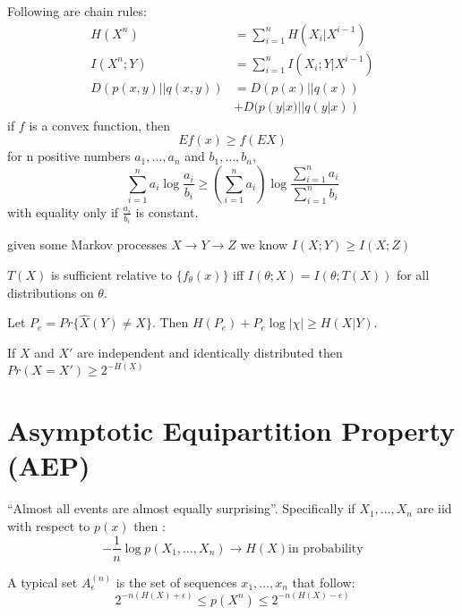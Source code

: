 \documentclass[10pt]{article}
\begin{document}
\begin{scriptsize}
\begin{multicols}{3}
Following are chain rules:
\begin{align}
H(X^n)&=\sum_{i=1}^n H(X_i|X^{i-1})\\
I(X^n;Y)&=\sum_{i=1}^n I(X_i;Y|X^{i-1})\\
D(p(x,y)||q(x,y))&=D(p(x)||q(x))\\
&+D(p(y|x)||q(y|x))
\end{align}
 \label{thm: jensen}
if $f$ is a convex function, then
\begin{equation}
Ef(x) \geq f(EX)
\end{equation}
 \label{thm: log sum}
for n positive numbers $a_1,\ldots,a_n$ and $b_1,\ldots,b_n$,
\begin{equation}
\sum_{i=1}^n a_i \log \frac{a_i}{b_i} \geq \left( \sum_{i=1}^n a_i \right) \log \frac{\sum_{i=1}^n a_i}{\sum_{i=1}^n b_i}
\end{equation}
with equality only if $\frac{a_i}{b_i}$ is constant. 

 \label{thm: data processing} 
given some Markov processes $X\rightarrow Y\rightarrow Z$ we know
\( I(X;Y) \geq I(X;Z) \)

 \label{thm: suff stats}
$T(X)$ is sufficient relative to $\{f_\theta (x)\}$ iff $I(\theta;X)=I(\theta;T(X))$ for all distributions on $\theta$.

 \label{thm: fano}
Let $P_e=Pr\{\hat{X}(Y)\neq X\}$. Then $H(P_e)+P_e \log |\chi| \geq H(X|Y)$.

\thm[Inequality] \label{thm: Ineq}
If $X$ and $X'$ are independent and identically distributed then $Pr(X=X') \geq 2^{-H(X)}$


\section*{Asymptotic Equipartition Property (AEP)}
``Almost all events are almost equally surprising''. Specifically if $X_1,\ldots,X_n$ are iid with respect to $p(x)$ then :
\begin{equation}
-\frac{1}{n}\log p(X_1,\ldots,X_n)\rightarrow H(X) \text{in probability}
\end{equation}

A typical set $A_\epsilon^{(n)}$ is the set of sequences $x_1,\ldots, x_n$ that follow:
\begin{equation}
2^{-n(H(X)+\epsilon)}\leq p(X^n)\leq 2^{-n(H(X)-\epsilon)}
\end{equation}


\end{multicols}
\end{scriptsize}
\end{document}
